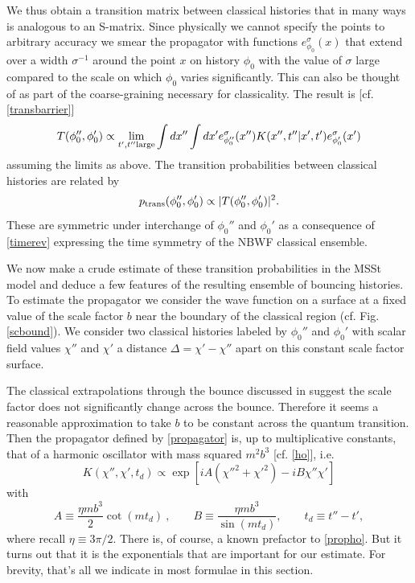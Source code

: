 \documentclass[prd,floats,superscriptaddress,eqsecnum,floatfix,nofootinbib,12pt]{revtex4}
\def\td{TD\ }
\def\p0{\phi_0}
\def\be{\begin{equation}}
\def\ee{\end{equation}}
\def\jf{}
\def\p0{\phi_0}
\def\td{t_d}
\begin{document}
{{{{We thus obtain a transition matrix between classical histories that in many ways is analogous to an S-matrix.  Since physically we cannot specify the points to arbitrary accuracy we smear the propagator with functions $e^{\sigma}_{\p0}(x)$ that extend over a width $\sigma^{-1}$ around the point $x$ on history $\p0$ with the value of $\sigma$ large compared to the scale on which $\p0$ varies significantly. This can also be thought of as part of the coarse-graining necessary for classicality. The result is [cf.\eqref{transbarrier}] 
\be
\label{transamp}
T(\p0'',\p0') \propto  \lim_{t',t'' {\rm large}} \int dx'' \int dx' e^{\sigma}_{\p0''}(x'') K(x'',t''|x',t')e^{\sigma}_{\p0'}(x') 
\ee
assuming the limits as above. 
The transition probabilities between classical histories are related by
\be
\label{transprob}
p_{\rm trans}(\p0'',\p0') \propto |T(\p0'',\p0')|^2 .
\ee
These are symmetric under interchange of $\p0''$ and $\p0'$ as a consequence of \eqref{timerev} expressing the time symmetry of the NBWF classical ensemble. 

We now {\jf make a crude} estimate of these transition probabilities in the MSSt model and deduce a few features of the resulting ensemble of bouncing histories. 
To estimate the propagator we consider the wave function on a surface at a fixed value of the scale factor $b$ near the boundary of the classical region (cf. Fig. \ref{scbound}). We consider two classical histories labeled by $\p0''$ and $\p0'$ with scalar field values $\chi''$ and $\chi'$ a distance $\Delta = \chi' - \chi'' $ apart on this constant scale factor surface.

The classical extrapolations through the bounce discussed in \cite{HHH08a} suggest the scale factor does not significantly change across the bounce. Therefore it seems a reasonable approximation to take $b$ to be constant across the quantum transition. Then the propagator defined by \eqref{propagator} is, up to multiplicative constants, that of a harmonic oscillator with mass squared $m^2b^3$ [cf. \eqref{ho}], i.e.
\be
\label{propho}
K(\chi'' ,\chi', \td) \propto \exp \left [iA(\chi''^2 + \chi'^2) -iB\chi'' \chi' \right]
\ee
with
\be
\label{propcoeff}
A\equiv\frac{\eta mb^3}{2} \cot(m\td)\ , \qquad B\equiv \frac{\eta mb^3}{\sin(m\td)}, \qquad \td \equiv t''-t ' ,
\ee
where recall $\eta\equiv3\pi/2$. 
{\jf There is, of course, a known prefactor to \eqref{propho}. But it turns out that it is the exponentials that are important for our estimate. For brevity, that's all we indicate in most formulae in this section.}

}}}}
\end{document}
